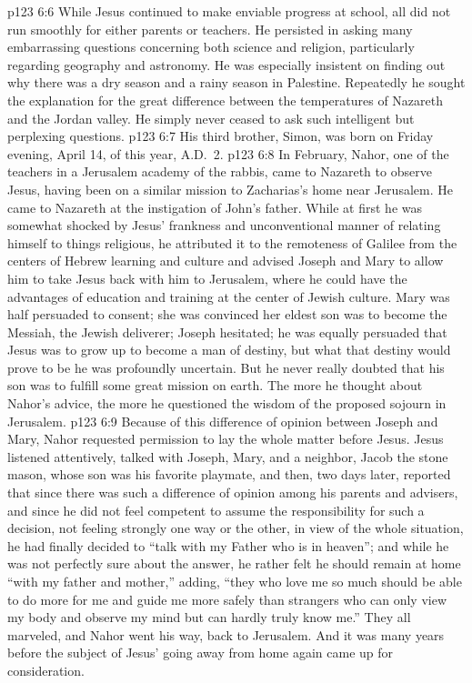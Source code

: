 \vs p123 6:6 While Jesus continued to make enviable progress at school, all did not run smoothly for either parents or teachers. He persisted in asking many embarrassing questions concerning both science and religion, particularly regarding geography and astronomy. He was especially insistent on finding out why there was a dry season and a rainy season in Palestine. Repeatedly he sought the explanation for the great difference between the temperatures of Nazareth and the Jordan valley. He simply never ceased to ask such intelligent but perplexing questions.
\pc \vs p123 6:7 His third brother, Simon, was born on Friday evening, April 14, of this year, A.D.~2.
\pc \vs p123 6:8 In February, Nahor, one of the teachers in a Jerusalem academy of the rabbis, came to Nazareth to observe Jesus, having been on a similar mission to Zacharias’s home near Jerusalem. He came to Nazareth at the instigation of John’s father. While at first he was somewhat shocked by Jesus’ frankness and unconventional manner of relating himself to things religious, he attributed it to the remoteness of Galilee from the centers of Hebrew learning and culture and advised Joseph and Mary to allow him to take Jesus back with him to Jerusalem, where he could have the advantages of education and training at the center of Jewish culture. Mary was half persuaded to consent; she was convinced her eldest son was to become the Messiah, the Jewish deliverer; Joseph hesitated; he was equally persuaded that Jesus was to grow up to become a man of destiny, but what that destiny would prove to be he was profoundly uncertain. But he never really doubted that his son was to fulfill some great mission on earth. The more he thought about Nahor’s advice, the more he questioned the wisdom of the proposed sojourn in Jerusalem.
\vs p123 6:9 Because of this difference of opinion between Joseph and Mary, Nahor requested permission to lay the whole matter before Jesus. Jesus listened attentively, talked with Joseph, Mary, and a neighbor, Jacob the stone mason, whose son was his favorite playmate, and then, two days later, reported that since there was such a difference of opinion among his parents and advisers, and since he did not feel competent to assume the responsibility for such a decision, not feeling strongly one way or the other, in view of the whole situation, he had finally decided to \textcolor{ubdarkred}{“talk with my Father who is in heaven”;} and while he was not perfectly sure about the answer, he rather felt he should remain at home “with my father and mother,” adding, “they who love me so much should be able to do more for me and guide me more safely than strangers who can only view my body and observe my mind but can hardly truly know me.” They all marveled, and Nahor went his way, back to Jerusalem. And it was many years before the subject of Jesus’ going away from home again came up for consideration.
